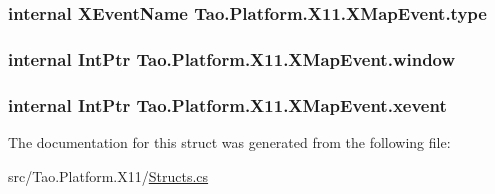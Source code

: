 \label{struct_tao_1_1_platform_1_1_x11_1_1_x_map_event_a1dc325d8590c607e012370c955bbfc05}
\hypertarget{struct_tao_1_1_platform_1_1_x11_1_1_x_map_event_a316b637457e9898775927ddbaeca45cd}{
\subsubsection[{type}]{\setlength{\rightskip}{0pt plus 5cm}internal {\bf XEventName} {\bf Tao.Platform.X11.XMapEvent.type}}}
\label{struct_tao_1_1_platform_1_1_x11_1_1_x_map_event_a316b637457e9898775927ddbaeca45cd}
\hypertarget{struct_tao_1_1_platform_1_1_x11_1_1_x_map_event_a1bc9e27b12738df48564282b50bba0e0}{
\subsubsection[{window}]{\setlength{\rightskip}{0pt plus 5cm}internal IntPtr {\bf Tao.Platform.X11.XMapEvent.window}}}
\label{struct_tao_1_1_platform_1_1_x11_1_1_x_map_event_a1bc9e27b12738df48564282b50bba0e0}
\hypertarget{struct_tao_1_1_platform_1_1_x11_1_1_x_map_event_a5cadc9af333118a7f6a71315da0dfdbe}{
\subsubsection[{xevent}]{\setlength{\rightskip}{0pt plus 5cm}internal IntPtr {\bf Tao.Platform.X11.XMapEvent.xevent}}}
\label{struct_tao_1_1_platform_1_1_x11_1_1_x_map_event_a5cadc9af333118a7f6a71315da0dfdbe}


The documentation for this struct was generated from the following file:\begin{DoxyCompactItemize}
\item 
src/Tao.Platform.X11/\hyperlink{_structs_8cs}{Structs.cs}\end{DoxyCompactItemize}
